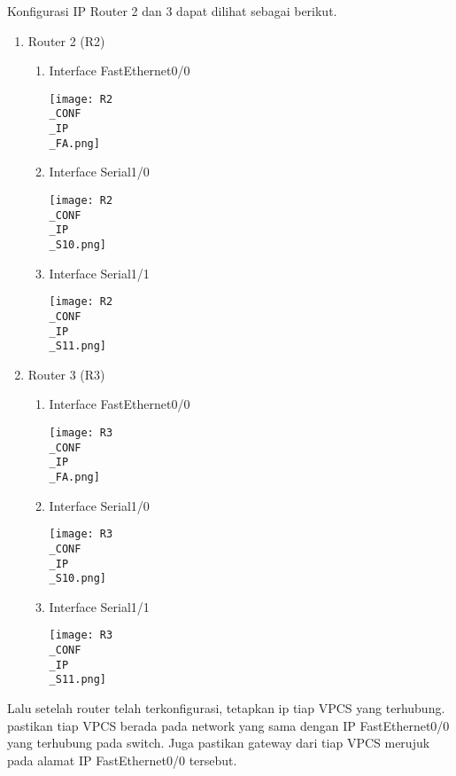 \documentclass[12pt, a4paper]{article}
\begin{document}
  Konfigurasi IP Router 2 dan 3 dapat dilihat sebagai berikut.
  \begin{enumerate}
    \item Router 2 (R2)
      \begin{enumerate}
        \item Interface FastEthernet0/0
          \begin{center}
            \texttt{[image: R2\\\_CONF\\\_IP\\\_FA.png]}
          \end{center}

        \item Interface Serial1/0
          \begin{center}
            \texttt{[image: R2\\\_CONF\\\_IP\\\_S10.png]}
          \end{center}

        \item Interface Serial1/1
          \begin{center}
            \texttt{[image: R2\\\_CONF\\\_IP\\\_S11.png]}
          \end{center}
      \end{enumerate}
    \item Router 3 (R3)
      \begin{enumerate}
        \item Interface FastEthernet0/0
          \begin{center}
            \texttt{[image: R3\\\_CONF\\\_IP\\\_FA.png]}
          \end{center}

        \item Interface Serial1/0
          \begin{center}
            \texttt{[image: R3\\\_CONF\\\_IP\\\_S10.png]}
          \end{center}

        \item Interface Serial1/1
          \begin{center}
            \texttt{[image: R3\\\_CONF\\\_IP\\\_S11.png]}
          \end{center}
      \end{enumerate}
  \end{enumerate}

  Lalu setelah router telah terkonfigurasi, tetapkan ip tiap VPCS yang terhubung.
  pastikan tiap VPCS berada pada network yang sama dengan IP FastEthernet0/0 yang
  terhubung pada switch. Juga pastikan gateway dari tiap VPCS merujuk
  pada alamat IP FastEthernet0/0 tersebut.
\end{document}
